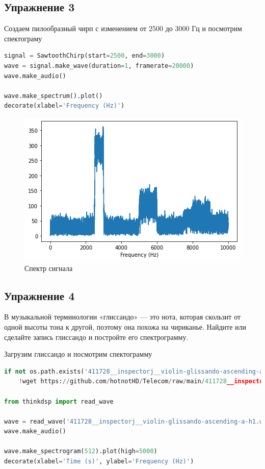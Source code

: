 \subsection{Упражнение 3}

Создаем пилообразный чирп с изменением от 2500 до 3000 Гц и посмотрим спектограму

\begin{lstlisting}[language=Python]
signal = SawtoothChirp(start=2500, end=3000)
wave = signal.make_wave(duration=1, framerate=20000)
wave.make_audio()

wave.make_spectrum().plot()
decorate(xlabel='Frequency (Hz)')
\end{lstlisting}

\begin{figure}[H]
	\begin{center}
		\includegraphics[scale=1]{fig/lab03/lab03_11.png}
		\caption{Спектр сигнала}
	\end{center}
\end{figure}

\subsection{Упражнение 4}

В музыкальной терминологии «глиссандо» — это нота, которая скользит от одной высоты тона к другой, поэтому она похожа на чириканье. Найдите или сделайте запись глиссандо и постройте его спектрограмму.

Загрузим глиссандо и посмотрим спектограмму

\begin{lstlisting}[language=Python]
if not os.path.exists('411728__inspectorj__violin-glissando-ascending-a-h1.wav'):
    !wget https://github.com/hotnotHD/Telecom/raw/main/411728__inspectorj__violin-glissando-ascending-a-h1.wav
    
from thinkdsp import read_wave

wave = read_wave('411728__inspectorj__violin-glissando-ascending-a-h1.wav')
wave.make_audio()

wave.make_spectrogram(512).plot(high=5000)
decorate(xlabel='Time (s)', ylabel='Frequency (Hz)')
\end{lstlisting}

